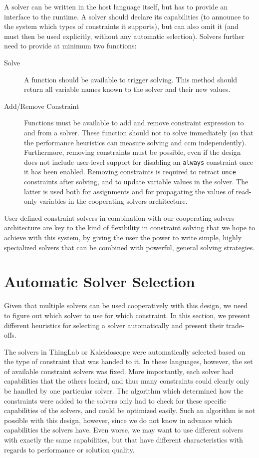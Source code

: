 A solver can be written in the host language itself, but has to
provide an interface to the runtime. A solver should declare its
capabilities (to announce to the system which types of constraints it
supports), but can also omit it (and must then be used explicitly,
without any automatic selection). Solvers further need to provide at
minimum two functions:
\begin{description}
\item[Solve] A function should be available to trigger solving. This
  method should return all variable names known to the solver and
  their new values.
\item[Add/Remove Constraint] Functions must be available to add and
  remove constraint expression to and from a solver. These function
  should not to solve immediately (so that the performance heuristics
  can measure solving and \gls{ccm} independently). Furthermore,
  removing constraints must be possible, even if the design does not
  include user-level support for disabling an \verb!always! constraint
  once it has been enabled. Removing constraints is required to
  retract \verb!once! constraints after solving, and to update
  variable values in the solver. The latter is used both for
  assignments and for propagating the values of read-only variables in
  the cooperating solvers architecture.
\end{description}

User-defined constraint solvers in combination with our cooperating solvers
architecture are key to the kind of flexibility in constraint solving that we
hope to achieve with this system, by giving the user the power to write simple,
highly specialized solvers that can be combined with powerful, general solving
strategies.

\section{Automatic Solver Selection}
\label{sec:autom-solv-select}

Given that multiple solvers can be used cooperatively with this
design, we need to figure out which solver to use for which
constraint. In this section, we present different heuristics for
selecting a solver automatically and present their trade-offs.

The solvers in ThingLab or Kaleidoscope were automatically selected
based on the type of constraint that was handed to it. In these
languages, however, the set of available constraint solvers was fixed. More
importantly, each solver had capabilities that the others lacked, and
thus many constraints could clearly only be handled by one particular
solver. The algorithm which determined how the constraints were added
to the solvers only had to check for these specific capabilities of
the solvers, and could be optimized easily. Such an algorithm is not
possible with this design, however, since we do not know in advance
which capabilities the solvers have. Even worse, we may want to use
different solvers with exactly the same capabilities, but that have
different characteristics with regards to performance or solution
quality.

